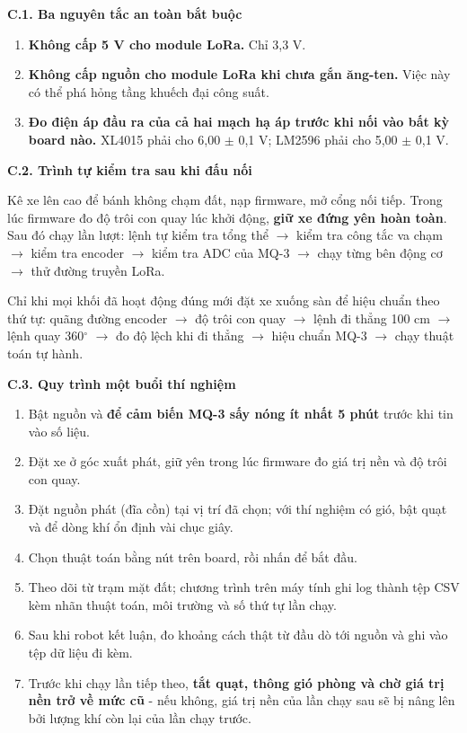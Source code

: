 \noindent \textbf{C.1. Ba nguyên tắc an toàn bắt buộc}

\begin{enumerate}[leftmargin=1.6em,itemsep=0.15em,topsep=0.3em]
  \item \textbf{Không cấp 5 V cho module LoRa.} Chỉ 3,3 V.
  \item \textbf{Không cấp nguồn cho module LoRa khi chưa gắn ăng-ten.} Việc này có thể phá hỏng tầng khuếch đại công suất.
  \item \textbf{Đo điện áp đầu ra của cả hai mạch hạ áp trước khi nối vào bất kỳ board nào.} XL4015 phải cho 6,00 $\pm$ 0,1 V; LM2596 phải cho 5,00 $\pm$ 0,1 V.
\end{enumerate}
\noindent \textbf{C.2. Trình tự kiểm tra sau khi đấu nối}

Kê xe lên cao để bánh không chạm đất, nạp firmware, mở cổng nối tiếp. Trong lúc firmware đo độ trôi con quay lúc khởi động, \textbf{giữ xe đứng yên hoàn toàn}. Sau đó chạy lần lượt: lệnh tự kiểm tra tổng thể $\rightarrow$ kiểm tra công tắc va chạm $\rightarrow$ kiểm tra encoder $\rightarrow$ kiểm tra ADC của MQ-3 $\rightarrow$ chạy từng bên động cơ $\rightarrow$ thử đường truyền LoRa.

Chỉ khi mọi khối đã hoạt động đúng mới đặt xe xuống sàn để hiệu chuẩn theo thứ tự: quãng đường encoder $\rightarrow$ độ trôi con quay $\rightarrow$ lệnh đi thẳng 100 cm $\rightarrow$ lệnh quay 360$^\circ$ $\rightarrow$ đo độ lệch khi đi thẳng $\rightarrow$ hiệu chuẩn MQ-3 $\rightarrow$ chạy thuật toán tự hành.

\noindent \textbf{C.3. Quy trình một buổi thí nghiệm}

\begin{enumerate}[leftmargin=1.6em,itemsep=0.15em,topsep=0.3em]
  \item Bật nguồn và \textbf{để cảm biến MQ-3 sấy nóng ít nhất 5 phút} trước khi tin vào số liệu.
  \item Đặt xe ở góc xuất phát, giữ yên trong lúc firmware đo giá trị nền và độ trôi con quay.
  \item Đặt nguồn phát (đĩa cồn) tại vị trí đã chọn; với thí nghiệm có gió, bật quạt và để dòng khí ổn định vài chục giây.
  \item Chọn thuật toán bằng nút trên board, rồi nhấn để bắt đầu.
  \item Theo dõi từ trạm mặt đất; chương trình trên máy tính ghi log thành tệp CSV kèm nhãn thuật toán, môi trường và số thứ tự lần chạy.
  \item Sau khi robot kết luận, đo khoảng cách thật từ đầu dò tới nguồn và ghi vào tệp dữ liệu đi kèm.
  \item Trước khi chạy lần tiếp theo, \textbf{tắt quạt, thông gió phòng và chờ giá trị nền trở về mức cũ} - nếu không, giá trị nền của lần chạy sau sẽ bị nâng lên bởi lượng khí còn lại của lần chạy trước.
\end{enumerate}
